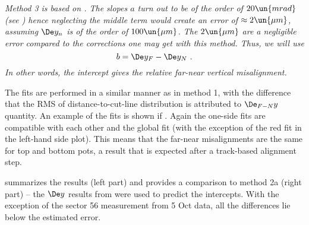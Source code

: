

\em{Method 3} is based on . The slopes $a$ turn out to be of the order of $20\un{mrad}$ (see ) hence neglecting the middle term would create an error of $\approx 2\un{\mu m}$, assuming $\De y_n$ is of the order of $100\un{\mu m}$. The $2\un{\mu m}$ are a negligible error compared to the corrections one may get with this method. Thus, we will use
$$b = \De y_F - \De y_N\ .$$
In other words, the intercept gives the relative far-near vertical misalignment.

The fits are performed in a similar manner as in method 1, with the difference that the RMS of distance-to-cut-line distribution is attributed to $\De_{F-N} y$ quantity. An example of the fits is shown if . Again the one-side fits are compatible with each other and the global fit (with the exception of the red fit in the left-hand side plot). This means that the far-near misalignments are the same for top and bottom pots, a result that is expected after a track-based alignment step.

 summarizes the results (left part) and provides a comparison to method 2a (right part) -- the $\De y$ results from  were used to predict the intercepts. With the exception of the sector 56 measurement from 5 Oct data, all the differences lie below the estimated error.


